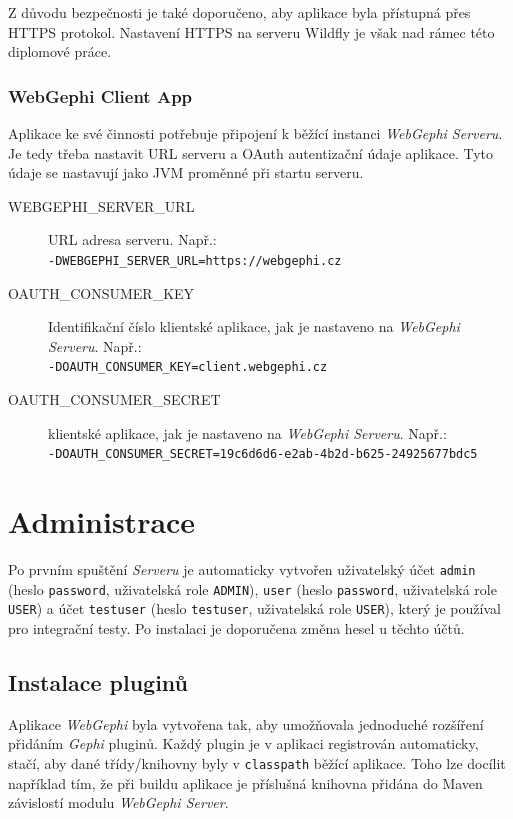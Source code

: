 \documentclass[thesis=M,czech]{FITthesis}[2014/05/6]
\begin{document}
Z důvodu bezpečnosti je také doporučeno, aby aplikace byla přístupná přes HTTPS protokol. Nastavení HTTPS na serveru Wildfly je však nad rámec této diplomové práce.

\subsubsection{WebGephi Client App}
Aplikace ke své činnosti potřebuje připojení k běžící instanci \textit{WebGephi Serveru}. Je tedy třeba nastavit URL serveru a OAuth autentizační údaje aplikace.
Tyto údaje se nastavují jako JVM proměnné při startu serveru.

\begin{description}
    \item[WEBGEPHI\_SERVER\_URL] URL adresa serveru. Např.:\\\texttt{-DWEB\-GEP\-HI\_SER\-VER\_URL=https://webgephi.cz}
	\item[OAUTH\_CONSUMER\_KEY] Identifikační číslo klientské aplikace, jak je nastaveno na \textit{WebGephi Serveru}. Např.:\\\texttt{-DOAUTH\_CON\-SU\-MER\_KEY=client.webgephi.cz}
	\item[OAUTH\_CONSUMER\_SECRET]  klientské aplikace, jak je nastaveno na \textit{WebGephi Serveru}. Např.:\\\texttt{-DOAUTH\_CON\-SU\-MER\_SECRET=}\texttt{19c6d6d6-e2ab-4b2d-b625-24925677bdc5}
\end{description}


\section{Administrace}
Po prvním spuštění \textit{Serveru} je automaticky vytvořen uživatelský účet \texttt{admin} (heslo \texttt{password}, uživatelská role \texttt{ADMIN}), 
\texttt{user} (heslo \texttt{password}, uživatelská role \texttt{USER}) a účet \texttt{testuser}  (heslo \texttt{testuser}, uživatelská role \texttt{USER}), který je 
používal pro integrační testy. Po instalaci je doporučena změna hesel u těchto účtů.

\subsection{Instalace pluginů}\label{appendix:plugins}
Aplikace \textit{WebGephi} byla vytvořena tak, aby umožňovala jednoduché rozšíření přidáním \textit{Gephi} pluginů. Každý plugin je v aplikaci registrován automaticky,
stačí, aby dané třídy/knihovny byly v \texttt{classpath} běžící aplikace. Toho lze docílit například tím, že při buildu aplikace je příslušná knihovna přidána do Maven závislostí modulu \textit{WebGephi Server}.
\end{document}
